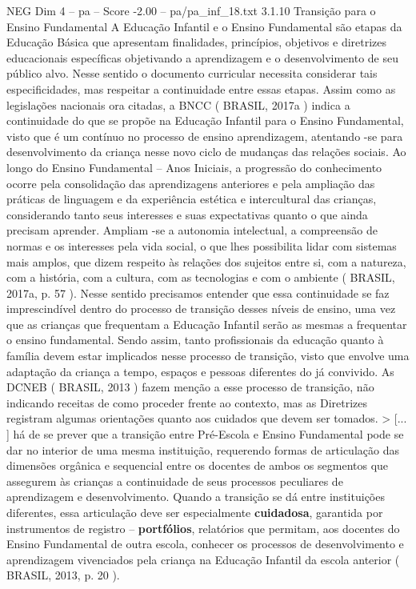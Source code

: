 \begin{textsample}{NEG Dim 4 – pa – Score -2.00 – pa/pa\_inf\_18.txt}  \label{ex:f4_neg_274}
3.1.10 Transição para o Ensino Fundamental A Educação Infantil e o Ensino Fundamental são etapas da Educação Básica que apresentam finalidades, princípios, objetivos e diretrizes educacionais específicas objetivando a aprendizagem e o desenvolvimento de seu público alvo.
Nesse sentido o documento curricular necessita considerar tais especificidades, mas respeitar a continuidade entre essas etapas.
Assim como as legislações nacionais ora citadas, a BNCC ( BRASIL, 2017a ) indica a continuidade do que se propõe na Educação Infantil para o Ensino Fundamental, visto que é um contínuo no processo de ensino aprendizagem, atentando -se para desenvolvimento da criança nesse novo ciclo de mudanças das relações sociais.
Ao longo do Ensino Fundamental – Anos Iniciais, a progressão do conhecimento ocorre pela consolidação das aprendizagens anteriores e pela ampliação das práticas de linguagem e da experiência estética e intercultural das crianças, considerando tanto seus interesses e suas expectativas quanto o que ainda precisam aprender.
Ampliam -se a autonomia intelectual, a compreensão de normas e os interesses pela vida social, o que lhes possibilita lidar com sistemas mais amplos, que dizem respeito às relações dos sujeitos entre si, com a natureza, com a história, com a cultura, com as tecnologias e com o ambiente ( BRASIL, 2017a, p. 57 ).
Nesse sentido precisamos entender que essa continuidade se faz imprescindível dentro do processo de transição desses níveis de ensino, uma vez que as crianças que frequentam a Educação Infantil serão as mesmas a frequentar o ensino fundamental.
Sendo assim, tanto profissionais da educação quanto à família devem estar implicados nesse processo de transição, visto que envolve uma adaptação da criança a tempo, espaços e pessoas diferentes do já convivido.
As DCNEB ( BRASIL, 2013 ) fazem menção a esse processo de transição, não indicando receitas de como proceder frente ao contexto, mas as Diretrizes registram algumas orientações quanto aos cuidados que devem ser tomados. > [... ] há de se prever que a transição entre Pré-Escola e Ensino Fundamental pode se dar no interior de uma mesma instituição, requerendo formas de articulação das dimensões orgânica e sequencial entre os docentes de ambos os segmentos que assegurem às crianças a continuidade de seus processos peculiares de aprendizagem e desenvolvimento.
Quando a transição se dá entre instituições diferentes, essa articulação deve ser especialmente \textbf{cuidadosa}, garantida por instrumentos de registro – \textbf{portfólios}, relatórios que permitam, aos docentes do Ensino Fundamental de outra escola, conhecer os processos de desenvolvimento e aprendizagem vivenciados pela criança na Educação Infantil da escola anterior ( BRASIL, 2013, p. 20 ).

\end{textsample}
